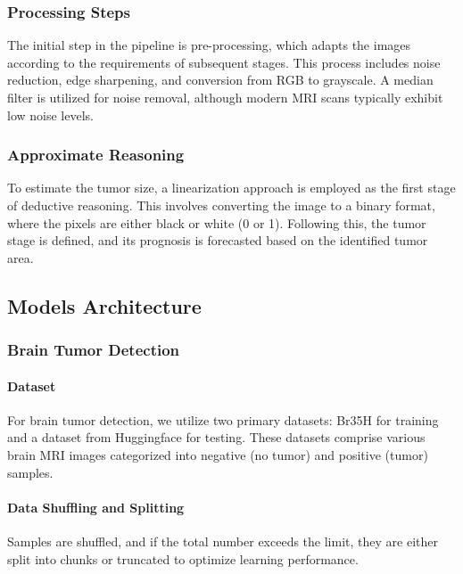 \documentclass[conference]{IEEEtran}
\begin{document}
\subsubsection{Processing Steps}

The initial step in the pipeline is pre-processing, which adapts the images according to the requirements of subsequent stages. This process includes noise reduction, edge sharpening, and conversion from RGB to grayscale. A median filter is utilized for noise removal, although modern MRI scans typically exhibit low noise levels.

\subsubsection{Approximate Reasoning}

To estimate the tumor size, a linearization approach is employed as the first stage of deductive reasoning. This involves converting the image to a binary format, where the pixels are either black or white (0 or 1). Following this, the tumor stage is defined, and its prognosis is forecasted based on the identified tumor area.

\subsection{Models Architecture}

\subsubsection{Brain Tumor Detection}

\paragraph{Dataset}

For brain tumor detection, we utilize two primary datasets: Br35H \cite{br35h} for training and a dataset from Huggingface \cite{huggingface_data} for testing. These datasets comprise various brain MRI images categorized into negative (no tumor) and positive (tumor) samples.

\paragraph{Data Shuffling and Splitting}
Samples are shuffled, and if the total number exceeds the limit, they are either split into chunks or truncated to optimize learning performance.
\end{document}

